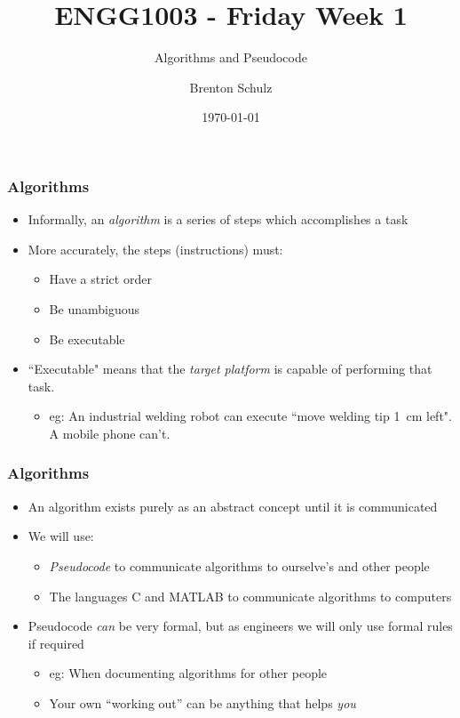 \documentclass[14pt]{beamer}
\title{ENGG1003 - Friday Week 1}
\subtitle{Algorithms and Pseudocode}
\author{Brenton Schulz}
\institute{University of Newcastle}
\date{\today}
\begin{document}
\titlepage

\begin{frame} %
\frametitle{Algorithms}
\begin{itemize}
\item Informally, an \textit{algorithm} is a series of steps which accomplishes a task
\item More accurately, the steps (instructions) must:
	\begin{itemize}
		\item Have a strict order
		\item Be unambiguous
		\item Be executable
	\end{itemize}
\item ``Executable" means that the \textit{target platform} is capable of performing that task.
	\begin{itemize}
		\item eg: An industrial welding robot can execute ``move welding tip 1~cm left". A mobile phone can't.
	\end{itemize}
\end{itemize}
\end{frame}

\begin{frame} %
\frametitle{Algorithms}
\begin{itemize}
\item An algorithm exists purely as an abstract concept until it is communicated
\item We will use:
	\begin{itemize}
	\item \textit{Pseudocode} to communicate algorithms to ourselve's and other people
	\item The languages C and MATLAB to communicate algorithms to computers
	\end{itemize}
\item Pseudocode \textit{can} be very formal, but as engineers we will only use formal rules if required
	\begin{itemize}
		\item eg: When documenting algorithms for other people
		\item Your own ``working out'' can be anything that helps \textit{you}
	\end{itemize}
\end{itemize}
\end{frame}
\end{document}
